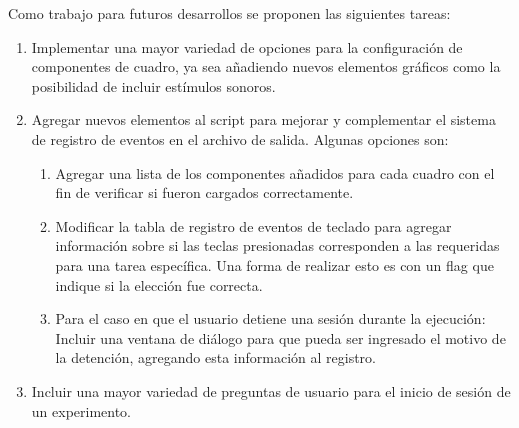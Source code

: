\documentclass[\main/main.tex]{subfiles}
\begin{document}
		Como trabajo para futuros desarrollos se proponen las siguientes tareas:
		\begin{enumerate}\setlength\itemsep{-0.2em}
			\item Implementar una mayor variedad de opciones para la configuración de componentes de cuadro, ya sea añadiendo nuevos elementos gráficos como la posibilidad de incluir estímulos sonoros.

			\item Agregar nuevos elementos al script para mejorar y complementar el sistema de registro de eventos en el archivo de salida. Algunas opciones son:
				\begin{enumerate}\setlength\itemsep{-0.2em}
					\item Agregar una lista de los componentes añadidos para cada cuadro con el fin de verificar si fueron cargados correctamente.

					\item Modificar la tabla de registro de eventos de teclado para agregar información sobre si las teclas presionadas corresponden a las requeridas para una tarea específica. Una forma de realizar esto es con un flag que indique si la elección fue correcta. 

					\item Para el caso en que el usuario detiene una sesión durante la ejecución: Incluir una ventana de diálogo para que pueda ser ingresado el motivo de la detención, agregando esta información al registro. 

				\end{enumerate}

			\item Incluir una mayor variedad de preguntas de usuario para el inicio de sesión de un experimento. 

		\end{enumerate}
	
\end{document}
